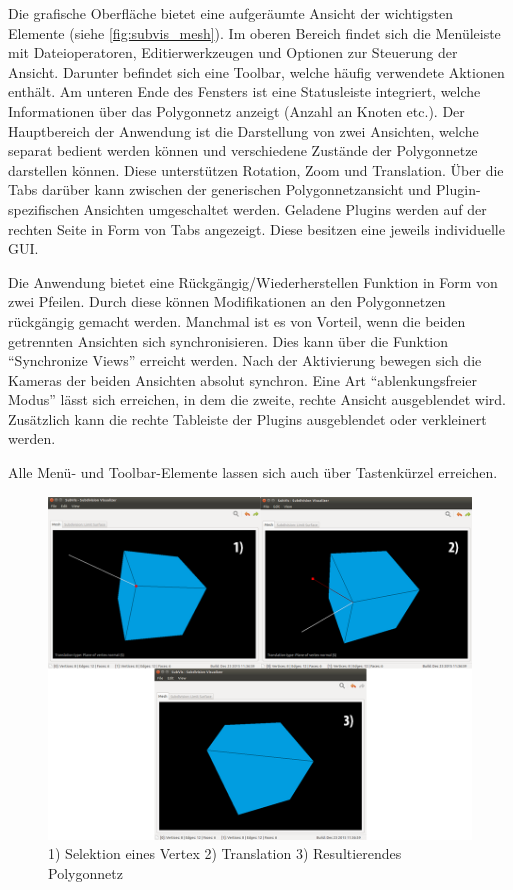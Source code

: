 Die grafische Oberfläche bietet eine aufgeräumte Ansicht der wichtigsten Elemente (siehe \autoref{fig:subvis_mesh}). 
Im oberen Bereich findet sich die Menüleiste mit Dateioperatoren, Editierwerkzeugen und Optionen zur Steuerung der Ansicht.
Darunter befindet sich eine Toolbar, welche häufig verwendete Aktionen enthält.
Am unteren Ende des Fensters ist eine Statusleiste integriert, welche Informationen über das Polygonnetz anzeigt (Anzahl an Knoten etc.).
Der Hauptbereich der Anwendung ist die Darstellung von zwei Ansichten, welche separat bedient werden können und verschiedene Zustände der Polygonnetze darstellen können.
Diese unterstützen Rotation, Zoom und Translation.
Über die Tabs darüber kann zwischen der generischen Polygonnetzansicht und Plugin-spezifischen Ansichten umgeschaltet werden.
Geladene Plugins werden auf der rechten Seite in Form von Tabs angezeigt.
Diese besitzen eine jeweils individuelle GUI.

Die Anwendung bietet eine Rückgängig/Wiederherstellen Funktion in Form von zwei Pfeilen. Durch diese können Modifikationen an den Polygonnetzen rückgängig gemacht werden.
Manchmal ist es von Vorteil, wenn die beiden getrennten Ansichten sich synchronisieren.
Dies kann über die Funktion \enquote{Synchronize Views} erreicht werden. 
Nach der Aktivierung bewegen sich die Kameras der beiden Ansichten  absolut synchron.
Eine Art \enquote{ablenkungsfreier Modus} lässt sich erreichen, in dem die zweite, rechte Ansicht ausgeblendet wird. 
Zusätzlich kann die rechte Tableiste der Plugins ausgeblendet oder verkleinert werden.

Alle Menü- und Toolbar-Elemente lassen sich auch über Tastenkürzel erreichen.

\begin{figure}
  \centering
  \includegraphics[width=\textwidth]{content/media/subvis_edit.png}
  \caption{1) Selektion eines Vertex 2) Translation 3) Resultierendes Polygonnetz}
  \label{fig:subvis_edit}
\end{figure}

